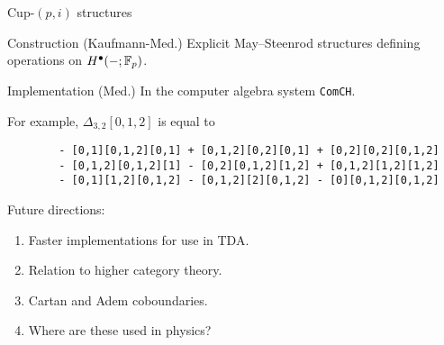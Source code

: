 \begin{frame}[fragile]{Cup-$(p,i)$ structures}

	\vskip-5pt\pause

	\begin{block}{Construction (Kaufmann-Med.)}
		Explicit May--Steenrod structures defining \textcolor{pblue}{operations} on $H^\bullet(-; {\mathbb{F}_p})$.
	\end{block}

	\pause

	\begin{block}{Implementation (Med.)}
		In the computer algebra system \verb|ComCH|.
	\end{block}

	\pause

	For example, $\Delta_{3,2}[0,1,2]$ is equal to

	\begin{verbatim}
		- [0,1][0,1,2][0,1] + [0,1,2][0,2][0,1] + [0,2][0,2][0,1,2]
		- [0,1,2][0,1,2][1] - [0,2][0,1,2][1,2] + [0,1,2][1,2][1,2]
		- [0,1][1,2][0,1,2] - [0,1,2][2][0,1,2] - [0][0,1,2][0,1,2]
	\end{verbatim}

	\pause \textcolor{pblue}{Future directions:} \pause
	\begin{enumerate}
		\item Faster implementations for use in TDA. \pause \\
		\item Relation to higher category theory. \pause \\
		\item Cartan and Adem coboundaries. \pause \\
		\item Where are these used in physics?
	\end{enumerate}
\end{frame}